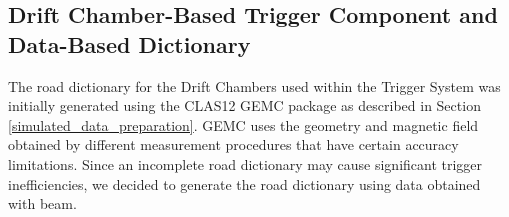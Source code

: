 \subsection{Drift Chamber-Based Trigger Component and Data-Based Dictionary}

The road dictionary for the Drift Chambers used within the Trigger System was initially generated using the CLAS12 GEMC package as described in Section \ref{simulated_data_preparation}. GEMC uses the geometry and magnetic field obtained by different measurement procedures that have certain accuracy limitations. Since an incomplete road dictionary may cause significant trigger inefficiencies, we decided to generate the road dictionary using data obtained with beam.
